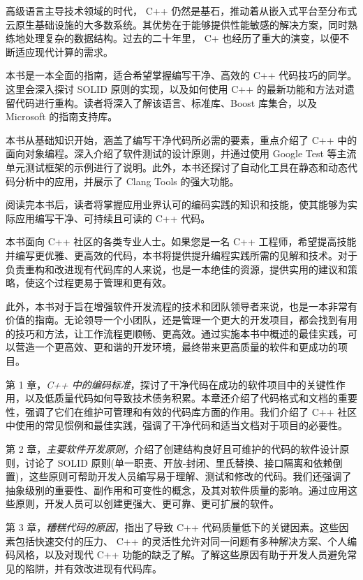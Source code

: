 ﻿高级语言主导技术领域的时代， C++ 仍然是基石，推动着从嵌入式平台至分布式云原生基础设施的大多数系统。其优势在于能够提供性能敏感的解决方案，同时熟练地处理复杂的数据结构。过去的二十年里， C+ 也经历了重大的演变，以便不断适应现代计算的需求。

本书是一本全面的指南，适合希望掌握编写干净、高效的 C++ 代码技巧的同学。这里会深入探讨 SOLID 原则的实现，以及如何使用 C++ 的最新功能和方法对遗留代码进行重构。读者将深入了解该语言、标准库、Boost 库集合，以及 Microsoft 的指南支持库。

本书从基础知识开始，涵盖了编写干净代码所必需的要素，重点介绍了 C++ 中的面向对象编程。深入介绍了软件测试的设计原则，并通过使用 Google Test 等主流单元测试框架的示例进行了说明。此外，本书还探讨了自动化工具在静态和动态代码分析中的应用，并展示了 Clang Tools 的强大功能。

阅读完本书后，读者将掌握应用业界认可的编码实践的知识和技能，使其能够为实际应用编写干净、可持续且可读的 C++ 代码。


本书面向 C++ 社区的各类专业人士。如果您是一名 C++ 工程师，希望提高技能并编写更优雅、更高效的代码，本书将提供提升编程实践所需的见解和技术。对于负责重构和改进现有代码库的人来说，也是一本绝佳的资源，提供实用的建议和策略，使这个过程更易于管理和更有效。

此外，本书对于旨在增强软件开发流程的技术和团队领导者来说，也是一本非常有价值的指南。无论领导一个小团队，还是管理一个更大的开发项目，都会找到有用的技巧和方法，让工作流程更顺畅、更高效。通过实施本书中概述的最佳实践，可以营造一个更高效、更和谐的开发环境，最终带来更高质量的软件和更成功的项目。


第 1 章，\textit{C++ 中的编码标准}，探讨了干净代码在成功的软件项目中的关键性作用，以及低质量代码如何导致技术债务积累。本章还介绍了代码格式和文档的重要性，强调了它们在维护可管理和有效的代码库方面的作用。我们介绍了 C++ 社区中使用的常见惯例和最佳实践，强调了干净代码和适当文档对于项目的必要性。

第 2 章，\textit{主要软件开发原则}，介绍了创建结构良好且可维护的代码的软件设计原则，讨论了 SOLID 原则(单一职责、开放-封闭、里氏替换、接口隔离和依赖倒置)，这些原则可帮助开发人员编写易于理解、测试和修改的代码。我们还强调了抽象级别的重要性、副作用和可变性的概念，及其对软件质量的影响。通过应用这些原则，开发人员可以创建更强大、更可靠、更可扩展的软件。

第 3 章，\textit{糟糕代码的原因}，指出了导致 C++ 代码质量低下的关键因素。这些因素包括快速交付的压力、 C++ 的灵活性允许对同一问题有多种解决方案、个人编码风格，以及对现代 C++ 功能的缺乏了解。了解这些原因有助于开发人员避免常见的陷阱，并有效改进现有代码库。

